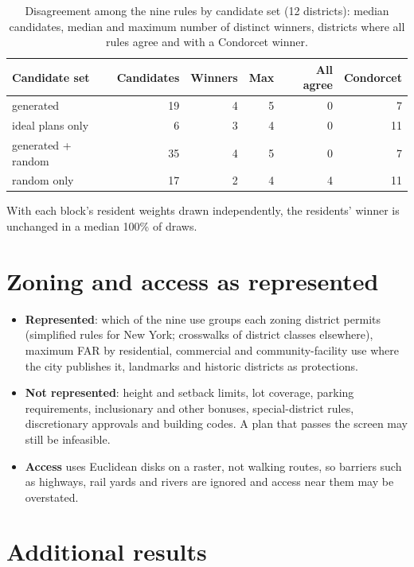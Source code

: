 \documentclass[10pt]{article}
\begin{document}
\begin{table}[t]
\centering
\footnotesize
\setlength{\tabcolsep}{4pt}
\caption{Disagreement among the nine rules by candidate set (12 districts): median candidates, median and maximum number of distinct winners, districts where all rules agree and with a Condorcet winner.}
\label{tab:s-vote-sets}
\begin{tabular}{lrrrrr}
\toprule
Candidate set & Candidates & Winners & Max & All agree & Condorcet \\
\midrule
generated & 19 & 4 & 5 & 0 & 7 \\
ideal plans only & 6 & 3 & 4 & 0 & 11 \\
generated + random & 35 & 4 & 5 & 0 & 7 \\
random only & 17 & 2 & 4 & 4 & 11 \\
\bottomrule
\end{tabular}
\par\smallskip
\begin{minipage}{0.95\linewidth}\footnotesize With each block's resident weights drawn independently, the residents' winner is unchanged in a median 100\% of draws.\end{minipage}
\end{table}

\section{Zoning and access as represented}\label{s:zoning}

\begin{itemize}
\item \textbf{Represented}: which of the nine use groups each zoning district permits (simplified rules for New York;
crosswalks of district classes elsewhere), maximum FAR by residential, commercial and community-facility use where the
city publishes it, landmarks and historic districts as protections.
\item \textbf{Not represented}: height and setback limits, lot coverage, parking requirements, inclusionary and other
bonuses, special-district rules, discretionary approvals and building codes. A plan that passes the screen may still
be infeasible.
\item \textbf{Access} uses Euclidean disks on a raster, not walking routes, so barriers such as highways, rail yards
and rivers are ignored and access near them may be overstated.
\end{itemize}

\section{Additional results}\label{s:additional}
\end{document}
